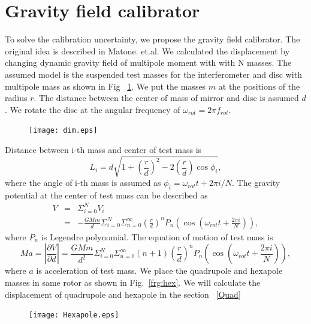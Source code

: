 \documentclass[12pt]{iopart}
\begin{document}
\section{Gravity field calibrator}
To solve the calibration uncertainty, we propose the gravity field calibrator. The original idea is described in Matone. et.al.
We calculated the displacement by changing dynamic gravity field of multipole moment with with N masses.
The assumed model is the suspended test masses for the interferometer and disc with multipole mass as shown in Fig ~\ref{fig:dim}.
We put the masses $m$ at the positions of the radius $r$. The distance between the center of mass of mirror and disc is assumed $d$.
We rotate the disc at the angular frequency of $\omega_{rot}=2\pi f_{rot}$.

\begin{figure}
\begin{center}
\texttt{[image: dim.eps]}
\caption{}
\label{fig:dim}
\end{center}
\end{figure}

Distance between i-th mass and center of test mass is 
\begin{equation}
L_i=d \sqrt{1+\left( \frac{r}{d} \right)^2 -2\left( \frac{r}{d} \right) \cos{\phi_i} },
\end{equation}
where the angle of i-th mass is assumed as $\phi_i=\omega_{rot} t + 2\pi i/N$.
The gravity potential at the center of test mass can be described as
\begin{eqnarray}
V &=& \Sigma^N_{i=0} V_i \\
&=&-\frac{GMm}{d} \Sigma^N_{i=0} \Sigma^{\infty}_{n=0} \left( \frac{r}{d} \right)^n P_n\left(\cos{\left(\omega_{rot} t +\frac{2 \pi i}{N}\right)}\right),
\end{eqnarray}
where $P_n$ is Legendre polynomial. The equation of motion of test mass is 
\begin{equation}
Ma=\left| \frac{\partial V}{\partial{d}} \right| =\frac{GMm}{d^2}\Sigma^N_{i=0} \Sigma^{\infty}_{n=0}(n+1) \left( \frac{r}{d} \right)^n P_n\left(\cos{\left(\omega_{rot} t +\frac{2 \pi i}{N}\right)}\right),
\end{equation}
where $a$ is acceleration of test mass. We place the quadrupole and hexapole masses in same rotor as shown in Fig.~\ref{frg:hex}. We will calculate the displacement of quadrupole and hexapole in the section ~\ref{Quad} 

\begin{figure}
\begin{center}
\texttt{[image: Hexapole.eps]}
\caption{}
\label{fig:hex}
\end{center}
\end{figure}
\end{document}
